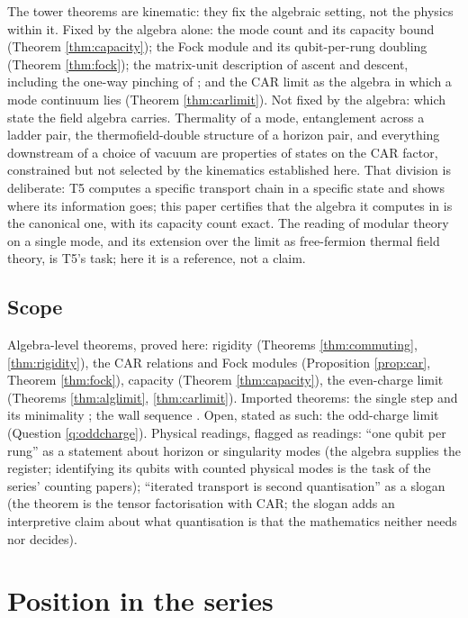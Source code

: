 \documentclass[11pt]{article}
\theoremstyle{definition}
\begin{document}
The tower theorems are kinematic: they fix the algebraic setting, not the physics within it. Fixed by the algebra alone: the mode count and its capacity bound (Theorem \ref{thm:capacity}); the Fock module and its qubit-per-rung doubling (Theorem \ref{thm:fock}); the matrix-unit description of ascent and descent, including the one-way pinching of \cite[\S7.3]{ButlerT1}; and the CAR limit as the algebra in which a mode continuum lies (Theorem \ref{thm:carlimit}). Not fixed by the algebra: which state the field algebra carries. Thermality of a mode, entanglement across a ladder pair, the thermofield-double structure of a horizon pair, and everything downstream of a choice of vacuum are properties of states on the CAR factor, constrained but not selected by the kinematics established here. That division is deliberate: T5 \cite{ButlerT5} computes a specific transport chain in a specific state and shows where its information goes; this paper certifies that the algebra it computes in is the canonical one, with its capacity count exact. The reading of modular theory on a single mode, and its extension over the limit as free-fermion thermal field theory, is T5's task; here it is a reference, not a claim.

\subsection{Scope}\label{subsec:scope}

Algebra-level theorems, proved here: rigidity (Theorems \ref{thm:commuting}, \ref{thm:rigidity}), the CAR relations and Fock modules (Proposition \ref{prop:car}, Theorem \ref{thm:fock}), capacity (Theorem \ref{thm:capacity}), the even-charge limit (Theorems \ref{thm:alglimit}, \ref{thm:carlimit}). Imported theorems: the single step and its minimality \cite{ButlerT1}; the wall sequence \cite{ButlerT4}. Open, stated as such: the odd-charge limit (Question \ref{q:oddcharge}). Physical readings, flagged as readings: ``one qubit per rung'' as a statement about horizon or singularity modes (the algebra supplies the register; identifying its qubits with counted physical modes is the task of the series' counting papers); ``iterated transport is second quantisation'' as a slogan (the theorem is the tensor factorisation with CAR; the slogan adds an interpretive claim about what quantisation is that the mathematics neither needs nor decides).

\section{Position in the series}\label{sec:position}
\end{document}
